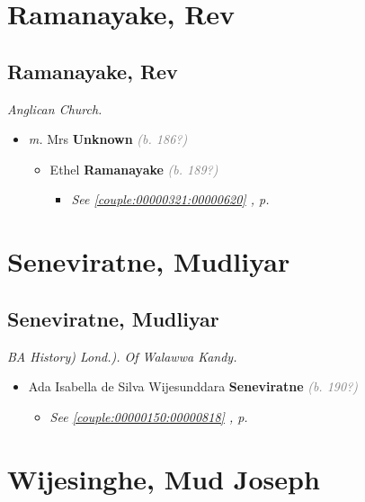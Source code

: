 \documentclass[10pt, openany]{book}
\begin{document}
\part{Ramanayake, Rev}
\chapter{Ramanayake, Rev}
\label{00000621}
\textcolor{slmaroon}{\textit{Anglican Church.}}
\begin{itemize}
\item{\textit{m.} Mrs \textbf{Unknown} \textcolor{gray}{\textit{(b. 186?)}}   \label{couple:00000621:00000896} \begin{itemize}
\item{Ethel \textbf{Ramanayake} \textcolor{gray}{\textit{(b. 189?)}}
\begin{itemize}
\item{\textcolor{slteal}{\textit{See  \autoref{couple:00000321:00000620} \textit{, p. \pageref{couple:00000321:00000620} }}}}
\end{itemize}
 }
\end{itemize}}
\end{itemize}
 
\part{Seneviratne, Mudliyar}
\chapter{Seneviratne, Mudliyar}
\label{00000827}
\textcolor{slmaroon}{\textit{BA History) Lond.).
Of Walawwa Kandy.}}
\begin{itemize}
\item{Ada Isabella de Silva Wijesunddara \textbf{Seneviratne} \textcolor{gray}{\textit{(b. 190?)}}
\begin{itemize}
\item{\textcolor{slteal}{\textit{See  \autoref{couple:00000150:00000818} \textit{, p. \pageref{couple:00000150:00000818} }}}}
\end{itemize}
     }
\end{itemize}
 
\part{Wijesinghe, Mud Joseph}
\end{document}
